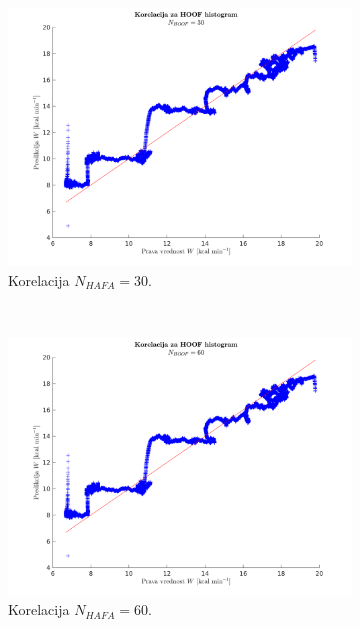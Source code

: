 \begin{figure}[htb]
	\centering
	\begin{subfigure}[t]{0.45\columnwidth}
		\includegraphics[width=\columnwidth]{./Slike/corr-hafa-30.png}
		\caption{Korelacija $N_{HAFA}=30$.}
		\label{fig:corr-hafa-30}
	\end{subfigure}
	~
	\begin{subfigure}[t]{0.45\columnwidth}
		\includegraphics[width=\columnwidth]{./Slike/corr-hafa-60.png}
		\caption{Korelacija $N_{HAFA}=60$.}
		\label{fig:corr-hafa-60}
	\end{subfigure}
	~
	\begin{subfigure}[b]{0.45\columnwidth}

\end{subfigure}
\end{figure}
